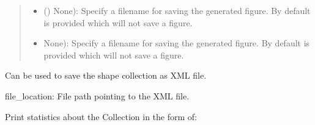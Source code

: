 \documentclass[a4paper,10pt,english,openany,oneside]{sphinxmanual}
\begin{document}
\begin{fulllineitems}
\begin{fulllineitems}
\begin{quote}
\begin{description}
\begin{itemize}
\item {} 
\sphinxAtStartPar
\sphinxstyleliteralstrong{\sphinxupquote{(}}\sphinxstyleliteralstrong{\sphinxupquote{{[}}}\sphinxstyleliteralstrong{\sphinxupquote{{]}}} () \textendash{} None): Specify a filename  for saving the generated figure. By default  is provided which will not save a figure.

\item {} 
\sphinxAtStartPar
{} \textendash{} None): Specify a filename  for saving the generated figure. By default  is provided which will not save a figure.

\end{itemize}

\end{description}\end{quote}

\end{fulllineitems}


\begin{fulllineitems}
\label{\detokenize{pages/modules:lmd.lib.Collection.save}}
\sphinxAtStartPar
Can be used to save the shape collection as XML file.

\sphinxAtStartPar
file\_location: File path pointing to the XML file.

\end{fulllineitems}


\begin{fulllineitems}
\label{\detokenize{pages/modules:lmd.lib.Collection.stats}}
\sphinxAtStartPar
Print statistics about the Collection in the form of:


\end{fulllineitems}
\end{fulllineitems}
\end{document}
